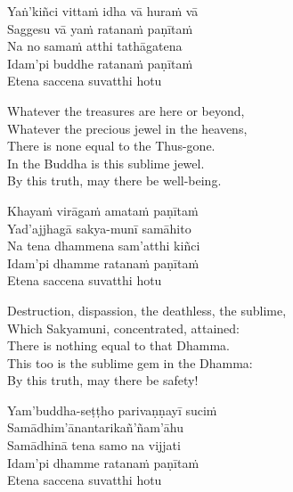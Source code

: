 \begin{pali-hang-continued}
  Yaṅ'kiñci vittaṁ idha vā huraṁ vā\\
  Saggesu vā yaṁ ratanaṁ paṇītaṁ\\
  Na no samaṁ atthi tathāgatena\\
  Idam'pi buddhe ratanaṁ paṇītaṁ\\
  Etena saccena suvatthi hotu
\end{pali-hang-continued}

\begin{english-verses}
  Whatever the treasures are here or beyond,\\
  Whatever the precious jewel in the heavens,\\
  There is none equal to the Thus-gone.\\
  In the Buddha is this sublime jewel.\\
  By this truth, may there be well-being.
\end{english-verses}

\begin{pali-hang-continued}
  Khayaṁ virāgaṁ amataṁ paṇītaṁ\\
  Yad'ajjhagā sakya-munī samāhito\\
  Na tena dhammena sam'atthi kiñci\\
  Idam'pi dhamme ratanaṁ paṇītaṁ\\
  Etena saccena suvatthi hotu
\end{pali-hang-continued}

\begin{english-verses}
  Destruction, dispassion, the deathless, the sublime,\\
  Which Sakyamuni, concentrated, attained:\\
  There is nothing equal to that Dhamma.\\
  This too is the sublime gem in the Dhamma:\\
  By this truth, may there be safety!
\end{english-verses}

\begin{pali-hang-continued}
  Yam'buddha-seṭṭho parivaṇṇayī suciṁ\\
  Samādhim'ānantarikañ'ñam'āhu\\
  Samādhinā tena samo na vijjati\\
  Idam'pi dhamme ratanaṁ paṇītaṁ\\
  Etena saccena suvatthi hotu
\end{pali-hang-continued}

